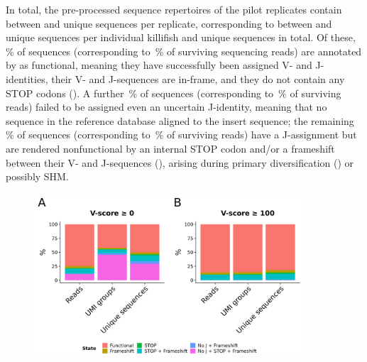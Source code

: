 In total, the pre-processed sequence repertoires of the pilot replicates contain between  and  unique sequences per replicate, corresponding to between  and  unique sequences per individual killifish and  unique sequences in total. Of these, \,\% of sequences (corresponding to \,\% of surviving sequencing reads) are annotated by  as functional, meaning they have successfully been assigned V- and J-identities, their V- and J-sequences are in-frame, and they do not contain any STOP codons (). A further \,\% of sequences (corresponding to \,\% of surviving reads) failed to be assigned even an uncertain J-identity, meaning that no \jh sequence in the reference database aligned to the insert sequence; the remaining \,\% of sequences (corresponding to \,\% of surviving reads) have a J-assignment but are rendered nonfunctional by an internal STOP codon and/or a frameshift between their V- and J-sequences (), arising during primary diversification () or possibly SHM.

\begin{figure}
\centering
\includegraphics[width = 0.9\textwidth]{_Figures/png/pilot-functional-prop}
\begin{subfigure}{0em}
\label{fig:igseq-pilot-functional-prop-a}
\end{subfigure}
\begin{subfigure}{0em}
\label{fig:igseq-pilot-functional-prop-b}
\end{subfigure}
\label{fig:igseq-pilot-functional-prop}
\end{figure}

